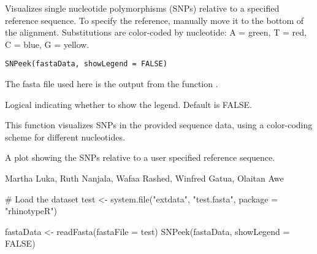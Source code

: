 \documentclass[a4paper]{book}
\begin{document}
%
\begin{Description}
Visualizes single nucleotide polymorphisms (SNPs) 
relative to a specified reference sequence. 
To specify the reference, manually move it to the bottom of the alignment. 
Substitutions are color-coded by nucleotide: A = green, T = red, C = blue, G = yellow.
\end{Description}
%
\begin{Usage}
\begin{verbatim}
SNPeek(fastaData, showLegend = FALSE)
\end{verbatim}
\end{Usage}
%
\begin{Arguments}
\begin{ldescription}
\item[\code{fastaData}] 
The fasta file used here is the output from the function .

\item[\code{showLegend}] 
Logical indicating whether to show the legend. Default is FALSE.

\end{ldescription}
\end{Arguments}
%
\begin{Details}
This function visualizes SNPs in the provided sequence data, 
using a color-coding scheme for different nucleotides.
\end{Details}
%
\begin{Value}
A plot showing the SNPs relative to a user specified reference sequence.
\end{Value}
%
\begin{Author}
Martha Luka, Ruth Nanjala, Wafaa Rashed, Winfred Gatua, Olaitan Awe 
\end{Author}
%
\begin{SeeAlso}
\end{SeeAlso}
%
\begin{Examples}
\begin{ExampleCode}
# Load the dataset
test <- system.file("extdata", "test.fasta", package = "rhinotypeR")

fastaData <- readFasta(fastaFile = test)
SNPeek(fastaData, showLegend = FALSE)
\end{ExampleCode}
\end{Examples}
\printindex{}
\end{document}
